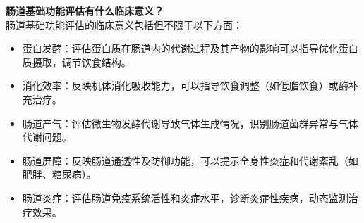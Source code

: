 \documentclass[UTF8]{ctexart}
\begin{document}
\begin{tcolorbox}[
    enhanced,
    colback=lightpurple!10, %
    colframe=white,  %
    arc=3mm,
    boxrule=0.5pt,
    width=\textwidth,
    top=8pt,
    bottom=8pt
]
{\small{\color{lightpurple}\faQuestionCircle}\quad \textbf{肠道基础功能评估有什么临床意义？}\\
{\color{orange!50}\faComments}\quad 肠道基础功能评估的临床意义包括但不限于以下方面：
\begin{itemize}
    \item 蛋白发酵：评估蛋白质在肠道内的代谢过程及其产物的影响可以指导优化蛋白质摄取，调节饮食结构。
    \item 消化效率：反映机体消化吸收能力，可以指导饮食调整（如低脂饮食）或酶补充治疗。
    \item 肠道产气：评估微生物发酵代谢导致气体生成情况，识别肠道菌群异常与气体代谢问题。
    \item 肠道屏障：反映肠道通透性及防御功能，可以提示全身性炎症和代谢紊乱（如肥胖、糖尿病）。
    \item 肠道炎症：评估肠道免疫系统活性和炎症水平，诊断炎症性疾病，动态监测治疗效果。
\end{itemize}
}
\end{tcolorbox}
\vspace{-0.7cm}
\end{document}
